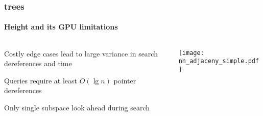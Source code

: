 \begin{frame}
  \frametitle{\kd trees}
  \framesubtitle{Height and its GPU limitations}

  \begin{columns}[T]
    \begin{column}{.5\textwidth}
      \begin{block}{}%
        {\color{white} \bullet\hspace{1mm} Costly edge cases lead to large variance in search dereferences 
          and time\\\vspace{0.5cm}
        
        \bullet\hspace{1mm} Queries require at least $O(\lg n)$ pointer dereferences\\\vspace{0.5cm}

      \bullet\hspace{1mm} Only single subspace look ahead during search}
      \end{block}
    \end{column}
    \begin{column}{.5\textwidth}
      \begin{block}{}
        \texttt{[image: nn\_adjaceny\_simple.pdf]}
      \end{block}
    \end{column}
  \end{columns}
\end{frame}
